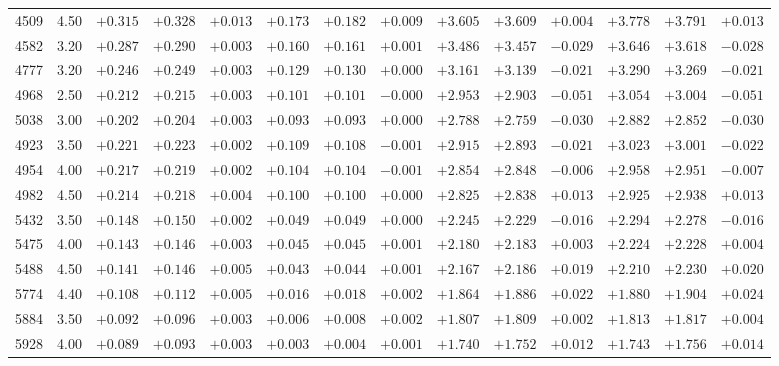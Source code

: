 \documentclass[]{aa}
\begin{document}
\begin{appendix}
\begin{table*}
\begin{center}
\begin{tabular}{llllllllllllll}
4509  &4.50 & $+0.315$ & $+0.328$ & $+0.013$ & $+0.173$ & $+0.182$ & $+0.009$ & $+3.605$ & $+3.609$ & $+0.004$ & $+3.778$ & $+3.791$ & $+0.013$ \\
4582  &3.20 & $+0.287$ & $+0.290$ & $+0.003$ & $+0.160$ & $+0.161$ & $+0.001$ & $+3.486$ & $+3.457$ & $-0.029$ & $+3.646$ & $+3.618$ & $-0.028$ \\
4777  &3.20 & $+0.246$ & $+0.249$ & $+0.003$ & $+0.129$ & $+0.130$ & $+0.000$ & $+3.161$ & $+3.139$ & $-0.021$ & $+3.290$ & $+3.269$ & $-0.021$ \\
4968  &2.50 & $+0.212$ & $+0.215$ & $+0.003$ & $+0.101$ & $+0.101$ & $-0.000$ & $+2.953$ & $+2.903$ & $-0.051$ & $+3.054$ & $+3.004$ & $-0.051$ \\
5038  &3.00 & $+0.202$ & $+0.204$ & $+0.003$ & $+0.093$ & $+0.093$ & $+0.000$ & $+2.788$ & $+2.759$ & $-0.030$ & $+2.882$ & $+2.852$ & $-0.030$ \\
4923  &3.50 & $+0.221$ & $+0.223$ & $+0.002$ & $+0.109$ & $+0.108$ & $-0.001$ & $+2.915$ & $+2.893$ & $-0.021$ & $+3.023$ & $+3.001$ & $-0.022$ \\
4954  &4.00 & $+0.217$ & $+0.219$ & $+0.002$ & $+0.104$ & $+0.104$ & $-0.001$ & $+2.854$ & $+2.848$ & $-0.006$ & $+2.958$ & $+2.951$ & $-0.007$ \\
4982  &4.50 & $+0.214$ & $+0.218$ & $+0.004$ & $+0.100$ & $+0.100$ & $+0.000$ & $+2.825$ & $+2.838$ & $+0.013$ & $+2.925$ & $+2.938$ & $+0.013$ \\
5432  &3.50 & $+0.148$ & $+0.150$ & $+0.002$ & $+0.049$ & $+0.049$ & $+0.000$ & $+2.245$ & $+2.229$ & $-0.016$ & $+2.294$ & $+2.278$ & $-0.016$ \\
5475  &4.00 & $+0.143$ & $+0.146$ & $+0.003$ & $+0.045$ & $+0.045$ & $+0.001$ & $+2.180$ & $+2.183$ & $+0.003$ & $+2.224$ & $+2.228$ & $+0.004$ \\
5488  &4.50 & $+0.141$ & $+0.146$ & $+0.005$ & $+0.043$ & $+0.044$ & $+0.001$ & $+2.167$ & $+2.186$ & $+0.019$ & $+2.210$ & $+2.230$ & $+0.020$ \\
5774  &4.40 & $+0.108$ & $+0.112$ & $+0.005$ & $+0.016$ & $+0.018$ & $+0.002$ & $+1.864$ & $+1.886$ & $+0.022$ & $+1.880$ & $+1.904$ & $+0.024$ \\
5884  &3.50 & $+0.092$ & $+0.096$ & $+0.003$ & $+0.006$ & $+0.008$ & $+0.002$ & $+1.807$ & $+1.809$ & $+0.002$ & $+1.813$ & $+1.817$ & $+0.004$ \\
5928  &4.00 & $+0.089$ & $+0.093$ & $+0.003$ & $+0.003$ & $+0.004$ & $+0.001$ & $+1.740$ & $+1.752$ & $+0.012$ & $+1.743$ & $+1.756$ & $+0.014$ \\

\end{tabular}
\end{center}
\end{table*}
\end{appendix}
\end{document}
